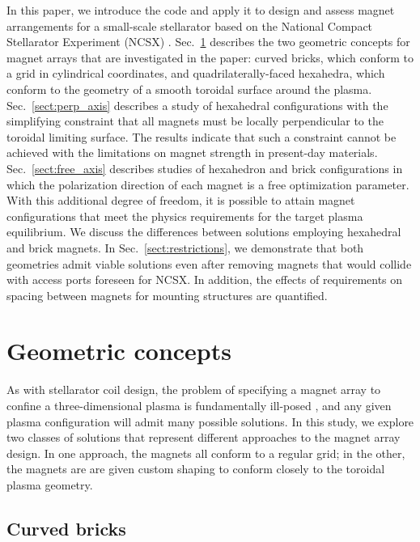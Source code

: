 \documentclass[11pt,onecolumn]{article}
\begin{document}
In this paper, we introduce the code and apply it to design and assess magnet
arrangements for a small-scale stellarator based on the National Compact 
Stellarator Experiment (NCSX) \cite{zarnstorff2001a,nelson2003a}.
Sec.~\ref{sect:concepts} describes the two geometric concepts for magnet arrays
that are investigated in the paper: curved bricks, which conform to a grid in 
cylindrical coordinates, and quadrilaterally-faced hexahedra, which conform
to the geometry of a smooth toroidal surface around the plasma.
Sec.~\ref{sect:perp_axis} describes a study of hexahedral configurations with 
the simplifying constraint that all magnets must be locally perpendicular to
the toroidal limiting surface. The results indicate that such a constraint
cannot be achieved with the limitations on magnet strength in present-day
materials. Sec.~\ref{sect:free_axis} describes studies of hexahedron and
brick configurations in which the polarization direction of each magnet is
a free optimization parameter. With this additional degree of freedom,
it is possible to attain magnet configurations that meet the physics 
requirements for the target plasma equilibrium. We discuss the differences
between solutions employing hexahedral and brick magnets. In 
Sec.~\ref{sect:restrictions}, we demonstrate that both geometries admit viable 
solutions even after removing magnets that would collide with access ports 
foreseen for NCSX. In addition, the effects of requirements on 
spacing between magnets for mounting structures are quantified.

\section{Geometric concepts}
\label{sect:concepts}

As with stellarator coil design, the problem of specifying a magnet array to 
confine a three-dimensional plasma is fundamentally ill-posed 
\cite{landreman2017a}, and any given plasma configuration will admit many
possible solutions. In this study, we explore two classes of solutions that
represent different approaches to the magnet array design. In one
approach, the magnets all conform to a regular grid; in the other, the magnets
are are given custom shaping to conform closely to the toroidal plasma 
geometry. 

\subsection{Curved bricks}
\label{ssect:cbricks}
\end{document}
